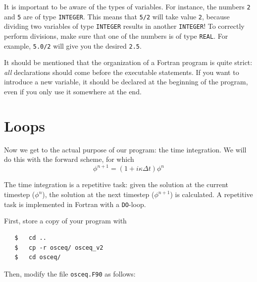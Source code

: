 \documentclass[a4paper]{article}
\begin{document}
%
\par
It is important to be aware of the types of variables. For instance, the numbers \verb+2+ and \verb+5+ are of type \verb+INTEGER+. This means that \verb+5/2+ will take value \verb+2+, because dividing two variables of type \verb+INTEGER+ results in another \verb+INTEGER+! To correctly perform divisions, make sure that one of the numbers is of type \verb+REAL+. For example, \verb+5.0/2+ will give you the desired \verb+2.5+.
%
\par
It should be mentioned that the organization of a Fortran program is quite strict: \emph{all} declarations should come before the executable statements. If you want to introduce a new variable, it should be declared at the beginning of the program, even if you only use it somewhere at the end.
%
\section{Loops}
%
\par
Now we get to the actual purpose of our program: the time integration. We will do this with the forward scheme, for which
%
\begin{equation*}
	\phi^{n+1}=(1+i\kappa\Delta t)\phi^n
\end{equation*}
%
\par
The time integration is a repetitive task: given the solution at the current timestep ($\phi^n$), the solution at the next timestep ($\phi^{n+1}$) is calculated. A repetitive task is implemented in Fortran with a \verb+DO+-loop.
%
\par
First, store a copy of your program with
%
\begin{verbatim}
   $   cd ..
   $   cp -r osceq/ osceq_v2
   $   cd osceq/
\end{verbatim}
%
\par
Then, modify the file \verb+osceq.F90+ as follows:
%
\end{document}
